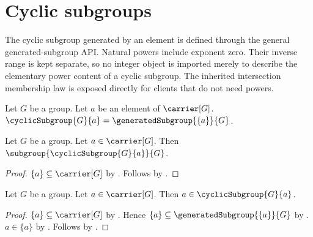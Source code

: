 


\section{Cyclic subgroups}

The cyclic subgroup generated by an element is defined through the general
generated-subgroup API.  Natural powers include exponent zero.  Their inverse
range is kept separate, so no integer object is imported merely to describe
the elementary power content of a cyclic subgroup.  The inherited intersection
membership law is exposed directly for clients that do not need powers.

\begin{definition}\label{cyclic_subgroup}
    Let $G$ be a group.
    Let $a$ be an element of $\carrier[G]$.
    $\cyclicSubgroup{G}{a}=\generatedSubgroup{\{a\}}{G}$.
\end{definition}

\begin{theorem}\label{cyclic_subgroup_is_subgroup}
    Let $G$ be a group.
    Let $a\in\carrier[G]$.
    Then $\subgroup{\cyclicSubgroup{G}{a}}{G}$.
\end{theorem}
\begin{proof}
    $\{a\}\subseteq\carrier[G]$ by
        .
    Follows by
        .
\end{proof}

\begin{proposition}\label{cyclic_subgroup_contains_generator}
    Let $G$ be a group.
    Let $a\in\carrier[G]$.
    Then $a\in\cyclicSubgroup{G}{a}$.
\end{proposition}
\begin{proof}
    $\{a\}\subseteq\carrier[G]$ by
        .
    Hence $\{a\}\subseteq\generatedSubgroup{\{a\}}{G}$ by
        .
    $a\in\{a\}$ by .
    Follows by .
\end{proof}


